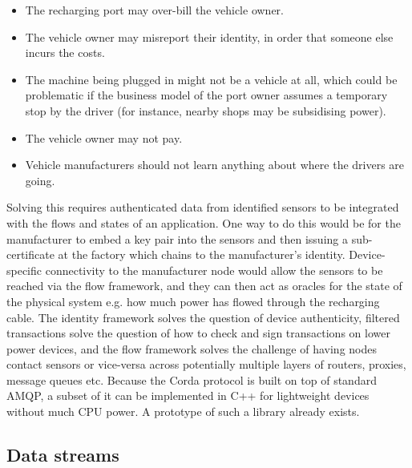 \documentclass{article}
\begin{document}
\begin{itemize}
    \item The recharging port may over-bill the vehicle owner.
    \item The vehicle owner may misreport their identity, in order that someone else incurs the costs.
    \item The machine being plugged in might not be a vehicle at all, which could be problematic if the business
          model of the port owner assumes a temporary stop by the driver (for instance, nearby shops may be
          subsidising power).
    \item The vehicle owner may not pay.
    \item Vehicle manufacturers should not learn anything about where the drivers are going.
\end{itemize}

Solving this requires authenticated data from identified sensors to be integrated with the flows and states of an
application. One way to do this would be for the manufacturer to embed a key pair into the sensors and then issuing
a sub-certificate at the factory which chains to the manufacturer's identity. Device-specific connectivity to the
manufacturer node would allow the sensors to be reached via the flow framework, and they can then act as oracles
for the state of the physical system e.g. how much power has flowed through the recharging cable. The identity
framework solves the question of device authenticity, filtered transactions solve the question of how to check and
sign transactions on lower power devices, and the flow framework solves the challenge of having nodes contact
sensors or vice-versa across potentially multiple layers of routers, proxies, message queues etc. Because the Corda
protocol is built on top of standard AMQP, a subset of it can be implemented in C++ for lightweight devices without
much CPU power. A prototype of such a library already exists.

\subsection{Data streams}\label{subsec:data-streams}
\end{document}
